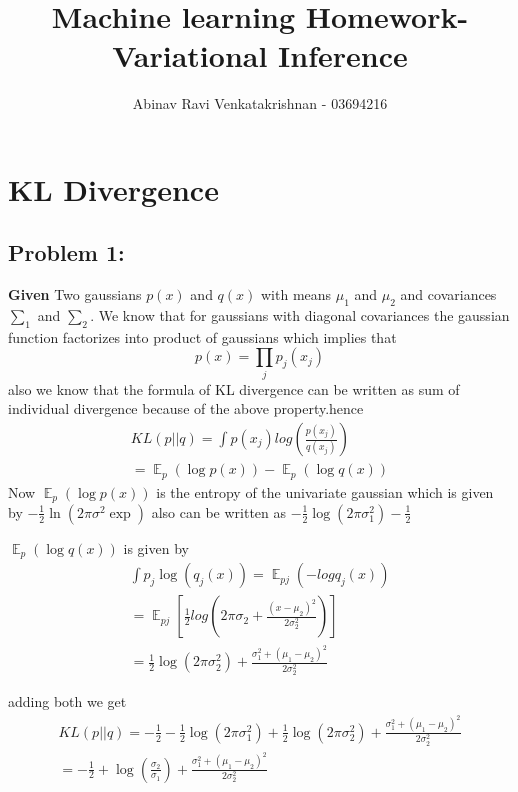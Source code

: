 \documentclass[5pt,a4paper]{article}
\DeclareMathOperator{\E}{\mathbb{E}}
\begin{document}
	\title{Machine learning Homework- Variational Inference }
	\author{Abinav Ravi Venkatakrishnan - 03694216}
	\maketitle
	\section{KL Divergence}
	\subsection*{Problem 1:}
	\textbf{Given} Two gaussians $ p(x) $ and $ q(x) $ with means $ \mu_1 $ and $ \mu_2 $ and covariances $ \sum_1 $ and $ \sum_2 $. We know that for gaussians with diagonal covariances the gaussian function factorizes into product of gaussians which implies that
	\begin{equation}
	p(x) = \prod_j p_j(x_j) 
	\end{equation}
	also we know that the formula of KL divergence can be written as sum of individual divergence because of the above property.hence
	\begin{eqnarray}
	KL(p||q) = \int p(x_j) log(\frac{p(x_j)}{q(x_j)})\\ = \E_p(\log p(x)) - \E_p(\log q(x)) 
	\end{eqnarray}
	Now $ \E_p (\log p(x)) $ is the entropy of the univariate gaussian which is given by $ -\frac{1}{2}\ln(2 \pi \sigma^2 \exp) $ also can be written as $ -\frac{1}{2} \log(2 \pi \sigma_{1}^2) - \frac{1}{2}$
	
	$ \E_p (\log q(x)) $ is given by
	\begin{eqnarray}
	\int p_j \log(q_j(x)) = \E_{pj}(-log q_j(x)) \\=\E_{pj}[\frac{1}{2}log(2\pi \sigma_{2}+\frac{(x-\mu_2)^2}{2\sigma_{2}^2})]\\ = \frac{1}{2}\log(2 \pi \sigma_{2}^2) + \frac{\sigma_{1}^2+(\mu_1 -\mu_2)^2}{2 \sigma_{2}^2}
	\end{eqnarray}
	
	adding both we get
	\begin{eqnarray}
	KL(p||q) = -\frac{1}{2}-\frac{1}{2} \log(2 \pi \sigma_{1}^2)+\frac{1}{2}\log(2 \pi \sigma_{2}^2) + \frac{\sigma_{1}^2+(\mu_1 -\mu_2)^2}{2 \sigma_{2}^2} \\ = -\frac{1}{2}+ \log(\frac{\sigma_{2}}{\sigma_{1}}) +\frac{\sigma_{1}^2+(\mu_1 -\mu_2)^2}{2 \sigma_{2}^2} 
	\end{eqnarray}
	
\end{document}

